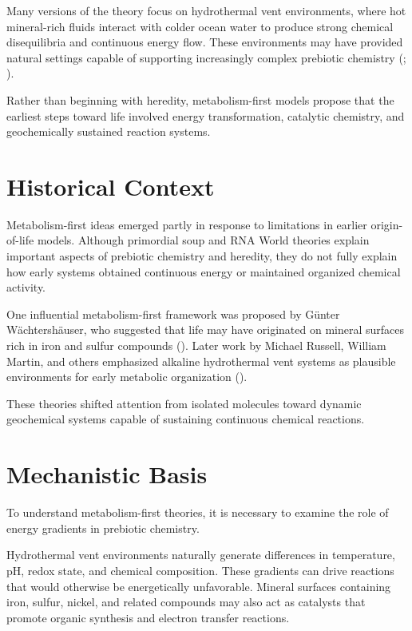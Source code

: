 \documentclass[
  oneside]{book}
\begin{document}
Many versions of the theory focus on hydrothermal vent environments, where hot mineral-rich fluids interact with colder ocean water to produce strong chemical disequilibria and continuous energy flow. These environments may have provided natural settings capable of supporting increasingly complex prebiotic chemistry (; ).

Rather than beginning with heredity, metabolism-first models propose that the earliest steps toward life involved energy transformation, catalytic chemistry, and geochemically sustained reaction systems.

\section{Historical Context}\label{historical-context-2}

Metabolism-first ideas emerged partly in response to limitations in earlier origin-of-life models. Although primordial soup and RNA World theories explain important aspects of prebiotic chemistry and heredity, they do not fully explain how early systems obtained continuous energy or maintained organized chemical activity.

One influential metabolism-first framework was proposed by Günter Wächtershäuser, who suggested that life may have originated on mineral surfaces rich in iron and sulfur compounds (). Later work by Michael Russell, William Martin, and others emphasized alkaline hydrothermal vent systems as plausible environments for early metabolic organization ().

These theories shifted attention from isolated molecules toward dynamic geochemical systems capable of sustaining continuous chemical reactions.

\section{Mechanistic Basis}\label{mechanistic-basis-2}

To understand metabolism-first theories, it is necessary to examine the role of energy gradients in prebiotic chemistry.

Hydrothermal vent environments naturally generate differences in temperature, pH, redox state, and chemical composition. These gradients can drive reactions that would otherwise be energetically unfavorable. Mineral surfaces containing iron, sulfur, nickel, and related compounds may also act as catalysts that promote organic synthesis and electron transfer reactions.
\end{document}
